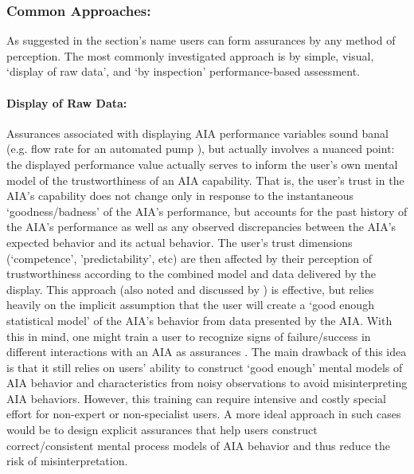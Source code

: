 \subsubsection{Common Approaches:}
As suggested in the section's name users can form assurances by any method of perception. The most commonly investigated approach is by simple, visual, `display of raw data', and `by inspection' performance-based assessment. %

\paragraph{Display of Raw Data:}
Assurances associated with displaying AIA performance variables sound banal (e.g. flow rate for an automated pump \cite{Muir1996-gt}), but actually involves a nuanced point: the displayed performance value actually serves to inform the user's own mental model of the trustworthiness of an AIA capability. That is, the user's trust in the AIA's capability does not change only in response to the instantaneous `goodness/badness' of the AIA's performance, but accounts for the past history of the AIA's performance as well as any observed discrepancies between the AIA's expected behavior and its actual behavior. The user's trust dimensions (`competence', 'predictability', etc) are then affected by their perception of trustworthiness according to the combined model and data delivered by the display. This approach (also noted and discussed by \cite{Wickens1999-la,Sheridan1984-kx,Hutchins2015-if}) is effective, but relies heavily on the implicit assumption that the user will create a `good enough statistical model' of the AIA's behavior from data presented by the AIA. With this in mind, one might train a user to recognize signs of failure/success in different interactions with an AIA as assurances \cite{Freedy2007-sg,Desai2012-rc,Salem2015-md}. The main drawback of this idea is that it still relies on users' ability to construct `good enough' mental models of AIA behavior and characteristics from noisy observations to avoid misinterpreting AIA behaviors. However, this training can require intensive and costly special effort for non-expert or non-specialist users. A more ideal approach in such cases would be to design explicit assurances that help users construct correct/consistent mental process models of AIA behavior and thus reduce the risk of misinterpretation.

